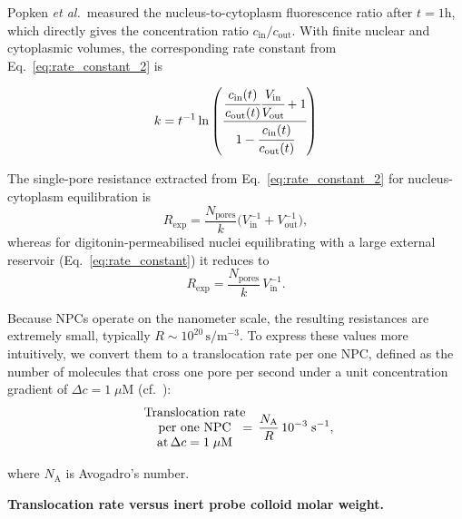 \documentclass[10pt, a4paper]{article}
\begin{document}
\begin{multicols}{2}
Popken \textit{et al.}\,\cite{Popken2015} measured the
nucleus-to-cytoplasm fluorescence ratio after $t =  1\text{h}$, which directly gives the concentration ratio
$c_{\text{in}}/c_{\text{out}}$.  
With finite nuclear and cytoplasmic volumes, the corresponding rate
constant from Eq.~\ref{eq:rate_constant_2} is

\begin{equation}
    k = t^{-1}\ln\left(
        \cfrac{\cfrac{c_{\text{in}}(t)}{c_{\text{out}}(t)} \cfrac{V_{\text{in}}}{V_{\text{out}}} +1}
             {1 - \cfrac{c_{\text{in}}(t)}{c_{\text{out}}(t)}}
        \right)
\end{equation}

The single-pore resistance extracted from Eq.~\ref{eq:rate_constant_2}
for nucleus-cytoplasm equilibration is
\begin{equation*}
  R_{\text{exp}}
  = \frac{N_{\text{pores}}}{k}
    \bigl(V_{\text{in}}^{-1}+V_{\text{out}}^{-1}\bigr),
\end{equation*}
whereas for digitonin-permeabilised nuclei equilibrating with a large
external reservoir (Eq.~\ref{eq:rate_constant}) it reduces to
\begin{equation*}
  R_{\text{exp}}
  = \frac{N_{\text{pores}}}{k}\,V_{\text{in}}^{-1}.
\end{equation*}

Because NPCs operate on the nanometer scale, the resulting resistances are extremely small, typically
$R\sim10^{20}\,\text{s}/\text{m}^{-3}$.  
To express these values more intuitively, we convert them to a
translocation rate per one NPC, defined as the number of molecules that cross one pore per second under a unit concentration gradient of $\Delta c = 1\;\mu\text{M}$ (cf.~\cite{Ribbeck2001}):
\begin{equation}
    \begin{array}{c}
        \text{Translocation rate} \\
        \text{per one NPC}\\
        \text{at} \, \Delta c = 1\;\mu\text{M}
    \end{array}
    \hspace{-1em}= \,\frac{N_{\mathrm{A}}}{R}\,10^{-3}\;\text{s}^{-1},
\end{equation}

where \(N_{\mathrm{A}}\) is Avogadro's number.


\textbf{Translocation rate versus inert probe colloid molar weight.}


\end{multicols}
\end{document}
